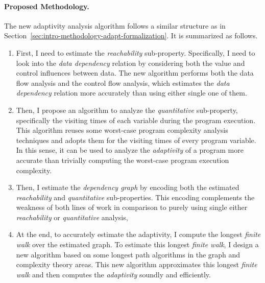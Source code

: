 \paragraph{Proposed Methodology.}
The new adaptivity analysis algorithm follows a similar structure as in Section~\ref{sec:intro-methodology-adapt-formalization}.
It is summarized as follows.
\begin{enumerate}
\item First, I need to estimate the \emph{reachability} sub-property.
Specifically, I need to look into 
the \emph{data dependency} relation by considering both the value and control influences between data.
The new algorithm
performs both the data flow analysis and the control flow analysis,
which
estimates the \emph{data dependency} relation
more accurately than using either single one of them.

\item Then, I propose an algorithm to analyze the
\emph{quantitative} sub-property, specifically the visiting times of each variable during the program execution.
This algorithm reuses some worst-case program complexity analysis techniques
and adopts them for the visiting times of every program variable.
In this sense, it can be used to analyze the \emph{adaptivity} of a program more accurate
than
trivially computing the worst-case program execution complexity.

\item 
Then, I estimate the \emph{dependency graph} by encoding both 
the estimated \emph{reachability} and \emph{quantitative} sub-properties.
This encoding complements the weakness of both lines of work in comparison to purely using single either \emph{reachability} or \emph{quantitative} analysis, 

%
\item At the end, to accurately estimate the adaptivity, I compute the longest \emph{finite walk} over the estimated graph. To estimate this longest \emph{finite walk}, I design a new algorithm based on some longest path algorithms in the graph and complexity theory areas.
This new algorithm approximates this longest \emph{finite walk} and then computes the \emph{adaptivity} soundly and efficiently.
\end{enumerate}

